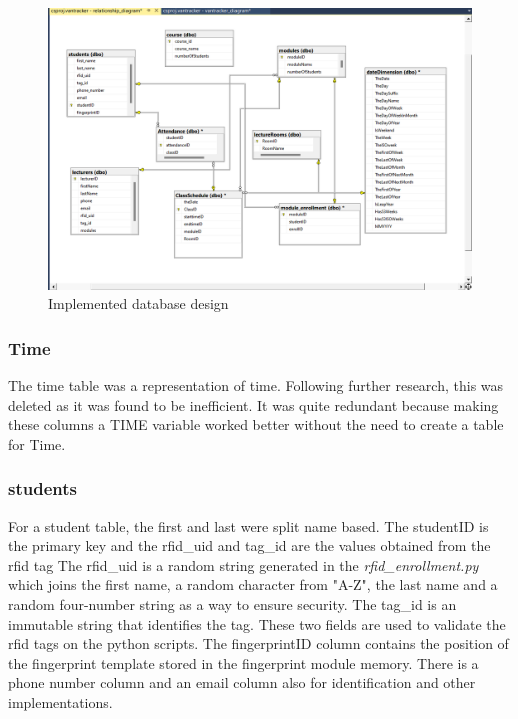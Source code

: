 \begin{center}
 \begin{figure}[ht]
   \includegraphics[scale=0.36]{Design & Implementation/images/2022-04-08.png}
   \caption{Implemented database design}
 \end{figure}
\end{center}
 
\subsubsection*{Time}
The time table was a representation of time. Following further research, this was deleted as it was found to be inefficient. It was quite redundant because making these columns a TIME variable worked better without the need to create a table for Time.
 
\subsubsection*{students}
For a student table, the first and last were split  name based. The studentID is the primary key and the rfid\_uid and tag\_id are the values obtained from the rfid tag The rfid\_uid is a random string generated in the \textit{rfid\_enrollment.py} which joins the first name, a random character from "A-Z", the last name and a random four-number string as a way to ensure security. The tag\_id is an immutable string that identifies the tag. These two fields are used to validate the rfid tags on the python scripts. The fingerprintID column contains the position of the fingerprint template stored in the fingerprint module memory. There is a phone number column and an email column also for identification and other implementations.
 
